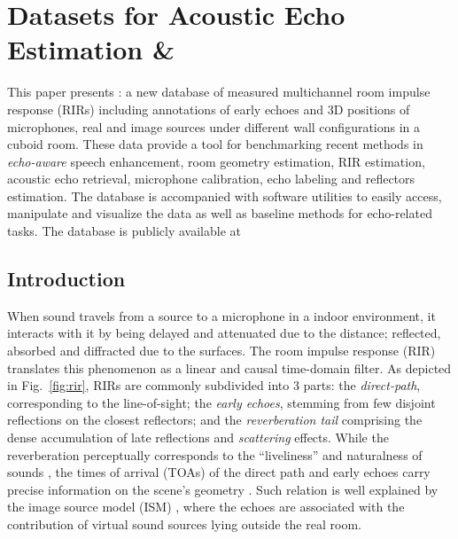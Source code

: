 \chapter{Datasets for Acoustic Echo Estimation \& \dechorate}\label{chap:estimation}
\vspace{-2.5em}

This paper presents \dEchorate{}: a new database of measured multichannel room impulse response (RIRs) including annotations of early echoes and 3D positions of microphones, real and image sources under different wall configurations in a cuboid room.
These data provide a tool for benchmarking recent methods in \textit{echo-aware} speech enhancement, room geometry estimation, RIR estimation, acoustic echo retrieval, microphone calibration, echo labeling and reflectors estimation.
The database is accompanied with software utilities to easily access, manipulate and visualize the data as well as baseline methods for echo-related tasks. The database is publicly available at \linkDechorate

\section{Introduction}\label{sec:dechorate:intro}

When sound travels from a source to a microphone in a indoor environment, it interacts with it by being delayed and attenuated due to the distance; reflected, absorbed and diffracted due to the surfaces. The room impulse response (RIR) translates this phenomenon as a linear and causal time-domain filter.
As depicted in Fig.~\ref{fig:rir}, RIRs are commonly subdivided into 3 parts:
the \textit{direct-path}, corresponding to the line-of-sight; the \textit{early echoes}, stemming from few disjoint reflections on the closest reflectors; and the \textit{reverberation tail} comprising the dense accumulation of late reflections and  \textit{scattering} effects. While the reverberation perceptually corresponds to the ``liveliness'' and naturalness of sounds \cite{geldard1953human}, the times of arrival (TOAs) of the direct path and early echoes carry precise information on the scene's geometry \cite{Kuttruff2009room}. Such relation is well explained by the image source model (ISM) \cite{Allen1979image}, where the echoes are associated with the contribution of virtual sound sources lying outside the real room.

